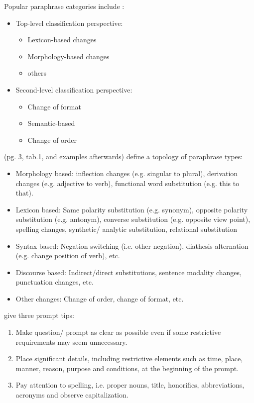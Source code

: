 Popular paraphrase categories include \cite{fu_learning_2024}:
\begin{itemize}
    \item Top-level classification perspective: 
        \begin{itemize}
            \item Lexicon-based changes
            \item Morphology-based changes
            \item others
        \end{itemize}
    \item Second-level classification perspective:
        \begin{itemize}
            \item Change of format
            \item Semantic-based
            \item Change of order
        \end{itemize}
\end{itemize}
\citet{zhou_paraphrase_2025} (pg. 3, tab.1, and examples afterwards) define a topology of paraphrase types:
\begin{itemize}
    \item Morphology based: inflection changes (e.g. singular to plural), derivation changes (e.g. adjective to verb), functional word substitution (e.g. this to that).
    \item Lexicon based: Same polarity substitution (e.g. synonym), opposite polarity substitution (e.g. antonym), converse substitution (e.g. opposite view point), spelling changes, synthetic/ analytic substitution, relational substitution
    \item Syntax based: Negation switching (i.e. other negation), diathesis alternation (e.g. change position of verb), etc.
    \item Discourse based: Indirect/direct substitutions, sentence modality changes, punctuation changes, etc.
    \item Other changes: Change of order, change of format, etc.
\end{itemize}

\citet{fu_learning_2024} give three prompt tips:
\begin{enumerate}
    \item Make question/ prompt as clear as possible even if some restrictive requirements may seem unnecessary.
    \item Place significant details, including restrictive elements such as time, place, manner, reason, purpose and conditions, at the beginning of the prompt.
    \item Pay attention to spelling, i.e. proper nouns, title, honorifics, abbreviations, acronyms and observe capitalization.
\end{enumerate}

